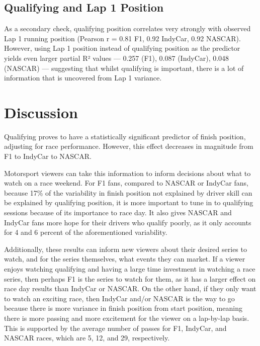 \documentclass[
  10pt]{article}
\begin{document}
\subsection{Qualifying and Lap 1
Position}\label{qualifying-and-lap-1-position}

As a secondary check, qualifying position correlates very strongly with
observed Lap 1 running position (Pearson r = 0.81 F1, 0.92 IndyCar, 0.92
NASCAR). However, using Lap 1 position instead of qualifying position as
the predictor yields even larger partial R² values --- 0.257 (F1), 0.087
(IndyCar), 0.048 (NASCAR) --- suggesting that whilst qualifying is
important, there is a lot of information that is uncovered from Lap 1
variance.

\section{Discussion}\label{discussion}

Qualifying proves to have a statistically significant predictor of
finish position, adjusting for race performance. However, this effect
decreases in magnitude from F1 to IndyCar to NASCAR.

Motorsport viewers can take this information to inform decisions about
what to watch on a race weekend. For F1 fans, compared to NASCAR or
IndyCar fans, because 17\% of the variability in finish position not
explained by driver skill can be explained by qualifying position, it is
more important to tune in to qualifying sessions because of its
importance to race day. It also gives NASCAR and IndyCar fans more hope
for their drivers who qualify poorly, as it only accounts for 4 and 6
percent of the aforementioned variability.

Additionally, these results can inform new viewers about their desired
series to watch, and for the series themselves, what events they can
market. If a viewer enjoys watching qualifying and having a large time
investment in watching a race series, then perhaps F1 is the series to
watch for them, as it has a larger effect on race day results than
IndyCar or NASCAR. On the other hand, if they only want to watch an
exciting race, then IndyCar and/or NASCAR is the way to go because there
is more variance in finish position from start position, meaning there
is more passing and more excitement for the viewer on a lap-by-lap
basis. This is supported by the average number of passes for F1,
IndyCar, and NASCAR races, which are 5, 12, and 29, respectively.
\end{document}
